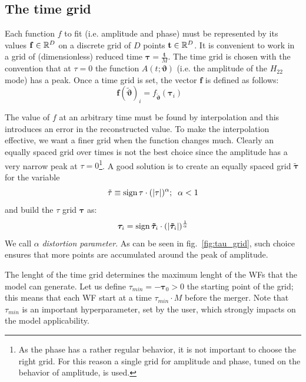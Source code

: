 \subsection{The time grid}
Each function $f$ to fit (i.e. amplitude and phase) must be represented by its values $\mathbf{f} \in \mathbb{R}^D$ on a discrete grid of $D$ points $\mathbf{t} \in \mathbb{R}^D$.
It is convenient to work in a grid of (dimensionless) reduced time $\boldsymbol{\tau} = \frac{\mathbf{t}}{M}$.
The time grid is chosen with the convention that at $\tau=0$ the function $A(t;\boldsymbol{\vartheta})$ (i.e. the amplitude of the $H_{22}$ mode) has a peak.
Once a time grid is set, the vector $\mathbf{f}$ is defined as follows:
\begin{equation}
	\mathbf{f}({\tilde{\boldsymbol{\vartheta}}})_i = f_{{\tilde{\boldsymbol{\vartheta}}}}(\boldsymbol{\tau}_i) \;\;\; 
\end{equation}
\par
The value of $f$ at an arbitrary time must be found by interpolation and this introduces an error in the reconstructed value.
To make the interpolation effective, we want a finer grid when the function changes much.
Clearly an equally spaced grid over times is not the best choice since the amplitude has a very narrow peak at $\tau=0$\footnote{As the phase has a rather regular behavior, it is not important to choose the right grid. For this reason a single grid for amplitude and phase, tuned on the behavior of amplitude, is used.}.
A good solution is to create an equally spaced grid $\boldsymbol{\tilde{\tau}}$ for the variable
\begin{equation} \label{eq:tau_tilde}
	{\tilde{\tau}} \equiv \operatorname{sign}{\tau} \cdot (|\tau|)^\alpha ;\;\; \alpha < 1
\end{equation}
and build the $\tau$ grid ${\boldsymbol{\tau}}$ as:
\begin{equation} \label{eq:tau_grid}
	{\boldsymbol{\tau}}_i = \operatorname{sign}{\boldsymbol{\tilde{\tau}}_i} \cdot (|\boldsymbol{\tilde{\tau}}_i|)^{\frac{1}{\alpha}}
\end{equation}
We call $\alpha$ \textit{distortion parameter}.
As can be seen in fig.~\ref{fig:tau_grid}, such choice ensures that more points are accumulated around the peak of amplitude.
\par
The lenght of the time grid determines the maximum lenght of the WFs that the model can generate.
Let us define $\tau_{min} = -{\boldsymbol{\tau}}_0 > 0 $ the starting point of the grid; this means that each WF start at a time $\tau_{min}\cdot M$ before the merger.
Note that $\tau_{min}$ is an important hyperparameter, set by the user, which strongly impacts on the model applicability.
